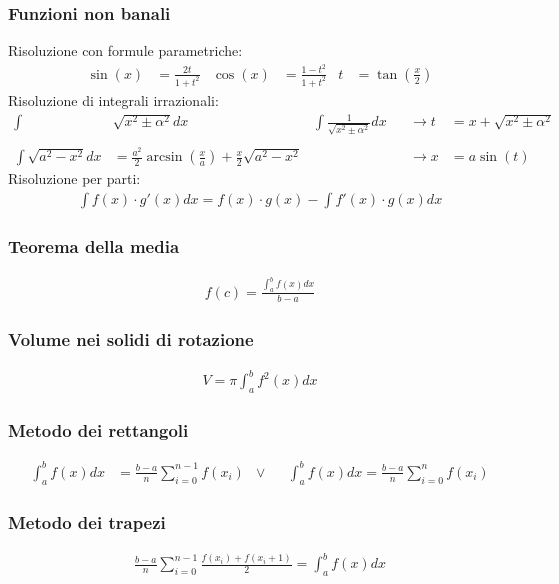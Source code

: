 \documentclass[a4paper]{article}
\begin{document}
	\subsubsection*{Funzioni non banali}
	Risoluzione con formule parametriche:
	\begin{align*}
		\sin (x) &= \frac{2t}{1+t^2}		&		\cos (x) &= \frac{1-t^2}{1+t^2}			& 	t &= \tan \left( \frac{x}{2} \right)
	\end{align*}
	Risoluzione di integrali irrazionali:
	\begin{align*}
		\int & \sqrt{x^2 \pm \alpha^2}	dx		&		\int  \frac{1}{\sqrt{x^2 \pm \alpha^2}}dx&	&	\rightarrow t &= x + \sqrt{x^2 \pm \alpha^2}\\\\
		\int \sqrt{a^2 - x^2}dx &= \frac{a^2}{2}\arcsin \left( \frac{x}{a} \right) + \frac{x}{2}\sqrt{a^2-x^2}	&&	&		\rightarrow x &= a\sin (t)
	\end{align*}
	Risoluzione per parti:
	\begin{align*}
		\int f(x) \cdot g'(x) dx = f(x) \cdot g(x) - \int f'(x) \cdot g(x) dx
	\end{align*}
		
	\subsubsection*{Teorema della media}
	\begin{align*}
		f(c) = \frac{\int_{a}^{b}f(x)dx}{b-a}
	\end{align*}
	\subsubsection*{Volume nei solidi di rotazione}
	\begin{align*}
		V =\pi \int_{a}^{b} f^2(x)dx
	\end{align*}
	
	\subsubsection*{Metodo dei rettangoli}
	\begin{align*}
		\int_{a}^{b}f(x)dx &= \frac{b-a}{n}\sum_{i=0}^{n-1}f(x_i)		&\vee&	&	\int_{a}^{b} f(x)dx =\frac{b-a}{n}\sum_{i=0}^{n} f(x_i)		
	\end{align*}
	
	\subsubsection*{Metodo dei trapezi}
	\begin{align*}
		\frac{b-a}{n}\sum_{i=0}^{n-1}\frac{f(x_i)+f(x_i + 1)}{2} = \int_{a}^{b} f(x)dx
	\end{align*}
	
\end{document}
